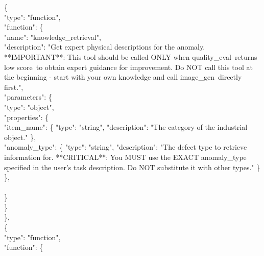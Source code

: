 \documentclass[sigconf]{acmart}
\begin{document}
\begin{tcolorbox}
\hspace*{1em}\{ \\
\hspace*{2em}"type": "function", \\
\hspace*{2em}"function": \{ \\
\hspace*{3em}"name": "knowledge\_retrieval", \\
\hspace*{3em}"description": "Get expert physical descriptions for the anomaly. **IMPORTANT**: This tool should be called ONLY when \textquotesingle quality\_eval\textquotesingle \ returns \textquotesingle low score\textquotesingle \ to obtain expert guidance for improvement. Do NOT call this tool at the beginning - start with your own knowledge and call \textquotesingle image\_gen\textquotesingle \ directly first.", \\
\hspace*{3em}"parameters": \{ \\
\hspace*{4em}"type": "object", \\
\hspace*{4em}"properties": \{ \\
\hspace*{5em}"item\_name": \{ "type": "string", "description": "The category of the industrial object." \}, \\
\hspace*{5em}"anomaly\_type": \{ "type": "string", "description": "The defect type to retrieve information for. **CRITICAL**: You MUST use the EXACT anomaly\_type specified in the user's task description. Do NOT substitute it with other types." \} \\
\hspace*{4em}\}, \\
\hspace*{4em}{"required": ["item\_name", "anomaly\_type"]} \\
\hspace*{3em}\} \\
\hspace*{2em}\} \\
\hspace*{1em}\}, \\
\hspace*{1em}\{ \\
\hspace*{2em}"type": "function", \\
\hspace*{2em}"function": \{ \\

\end{tcolorbox}
\end{document}
